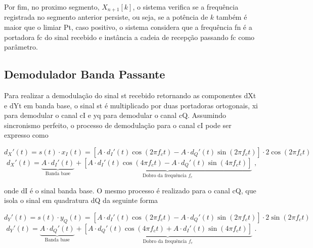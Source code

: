 Por fim, no proximo segmento, $X_{n+1}[k]$, o sistema verifica se a frequência registrada no segmento anterior persiste, ou seja, se a potência de $k$ também é maior que o limiar \gls{Pt}, caso positivo, o sistema considera que a frequência \gls{fn} é a portadora \gls{fc} do sinal recebido e instância a cadeia de recepção passando \gls{fc} como parâmetro.



\subsection{Demodulador Banda Passante}

Para realizar a demodulação do sinal \gls{st} recebido retornando as componentes \gls{dXt} e \gls{dYt} em banda base, o sinal \gls{st} é multiplicado por duas portadoras ortogonais, \gls{xi} para demodular o canal \gls{cI} e \gls{yq} para demodular o canal \gls{cQ}. Assumindo sincronismo perfeito, o processo de demodulação para o canal \gls{cI} pode ser expresso como

\vspace{-1.2em}
\begin{equation}
d_X'(t) = s(t) \cdot x_I(t) = \left[A \cdot d_I'(t) \cos(2\pi f_c t ) - A \cdot d_Q'(t) \sin(2\pi f_c t )\right] \cdot 2\cos(2\pi f_c t )
\end{equation}
\vspace{-0.8em}
\begin{equation}
    d_X'(t) =
    \underbrace{A \cdot d_I'(t)}_{\text{Banda base}} + 
    \underbrace{\left[
        A \cdot d_I'(t) \cos(4\pi f_c t ) 
        - A \cdot d_Q'(t) \sin(4\pi f_c t )
    \right]}_{\text{Dobro da frequência $f_c$}} \text{ ,}
\end{equation}

\noindent onde \gls{dI} é o sinal banda base. O mesmo processo é realizado para o canal \gls{cQ}, que isola o sinal em quadratura \gls{dQ} da seguinte forma

\vspace{-1.2em}
\begin{equation}
d_Y'(t) = s(t) \cdot y_Q(t) = \left[A \cdot d_I'(t) \cos(2\pi f_c t ) - A \cdot d_Q'(t) \sin(2\pi f_c t )\right] \cdot 2\sin(2\pi f_c t )
\end{equation}
\vspace{-0.8em}
\begin{equation}
    d_Y'(t) =  
    \underbrace{A \cdot d_Q'(t)}_{\text{Banda base}} + 
    \underbrace{\left[
        A \cdot d_Q'(t) \cos(4\pi f_c t ) 
        + A \cdot d_I'(t) \sin(4\pi f_c t )
    \right]}_{\text{Dobro da frequência $f_c$}} \text{ .}
\end{equation}

